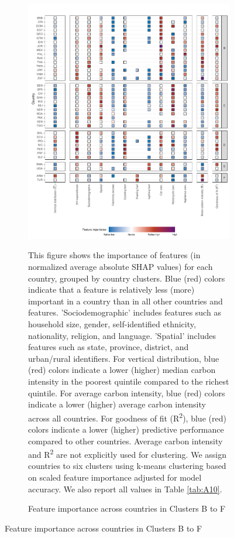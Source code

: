\documentclass[12pt, a4paper]{article}
\newenvironment{subcaption2}
{\strut
\vspace{-5pt}
\begin{minipage}[b]{0.95\textwidth}
  \hspace*{-\parindent}
  \footnotesize}
 {\end{minipage}}
\begin{document}
\clearpage
\begin{figure}[ht!]\ContinuedFloat
    \centering
    \begin{subfigure}[b]{\textwidth}
    \centering
    \caption{Feature importance across countries in Clusters B to F}\label{fig:fig_4_2}
    \includegraphics{Figure 4/Figure_4_Corrected_2.pdf}
    \begin{subcaption2}
    This figure shows the importance of features (in normalized average absolute SHAP values) for each country, grouped by country clusters. Blue (red) colors indicate that a feature is relatively less (more) important in a country than in all other countries and features. 'Sociodemographic' includes features such as household size, gender, self-identified ethnicity, nationality, religion, and language. 'Spatial' includes features such as state, province, district, and urban/rural identifiers. For vertical distribution, blue (red) colors indicate a lower (higher) median carbon intensity in the poorest quintile compared to the richest quintile. For average carbon intensity, blue (red) colors indicate a lower (higher) average carbon intensity across all countries. For goodness of fit (R\textsuperscript{2}), blue (red) colors indicate a lower (higher) predictive performance compared to other countries. Average carbon intensity and R\textsuperscript{2} are not explicitly used for clustering.
    We assign countries to six clusters using k-means clustering based on scaled feature importance adjusted for model accuracy. We also report all values in Table \ref{tab:A10}.
    \end{subcaption2}
    \end{subfigure}
    
\end{figure}
\end{document}
